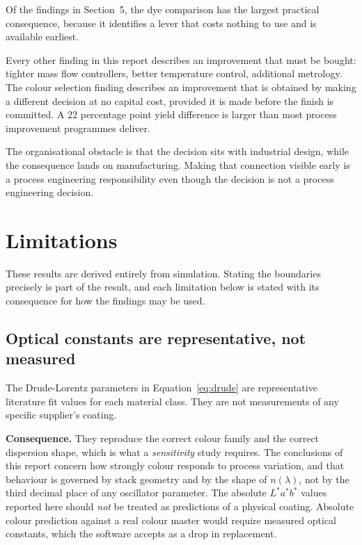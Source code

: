 \documentclass[11pt,a4paper]{article}
\begin{document}
Of the findings in Section~5, the dye comparison has the largest practical
consequence, because it identifies a lever that costs nothing to use and is
available earliest.

Every other finding in this report describes an improvement that must be bought:
tighter mass flow controllers, better temperature control, additional
metrology. The colour selection finding describes an improvement that is
obtained by making a different decision at no capital cost, provided it is made
before the finish is committed. A 22 percentage point yield difference is larger
than most process improvement programmes deliver.

The organisational obstacle is that the decision sits with industrial design,
while the consequence lands on manufacturing. Making that connection visible
early is a process engineering responsibility even though the decision is not a
process engineering decision.

\section{Limitations}

These results are derived entirely from simulation. Stating the boundaries
precisely is part of the result, and each limitation below is stated with its
consequence for how the findings may be used.

\subsection{Optical constants are representative, not measured}

The Drude-Lorentz parameters in Equation~\eqref{eq:drude} are representative
literature fit values for each material class. They are not measurements of any
specific supplier's coating.

\textbf{Consequence.} They reproduce the correct colour family and the correct
dispersion shape, which is what a \emph{sensitivity} study requires. The
conclusions of this report concern how strongly colour responds to process
variation, and that behaviour is governed by stack geometry and by the shape of
$n(\lambda)$, not by the third decimal place of any oscillator parameter. The
absolute $L^*a^*b^*$ values reported here should \emph{not} be treated as
predictions of a physical coating. Absolute colour prediction against a real
colour master would require measured optical constants, which the software
accepts as a drop in replacement.
\end{document}
